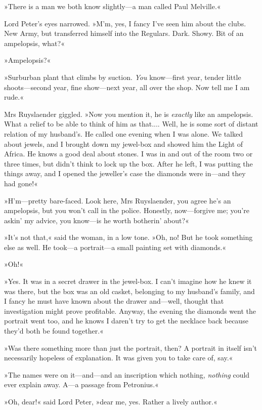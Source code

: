 »There is a man we both know slightly—a man called Paul Melville.«

Lord Peter's eyes narrowed. »M'm, yes, I fancy I've seen him about the clubs. New Army, but transferred himself into the Regulars. Dark. Showy. Bit of an ampelopsis, what?«

»Ampelopsis?«

»Surburban plant that climbs by suction. \textit{You} know—first year, tender little shoots—second year, fine show—next year, all over the shop. Now tell me I am rude.«

Mrs Ruyslaender giggled. »Now you mention it, he is \textit{exactly} like an ampelopsis. What a relief to be able to think of him as that.... Well, he is some sort of distant relation of my husband's. He called one evening when I was alone. We talked about jewels, and I brought down my jewel-box and showed him the Light of Africa. He knows a good deal about stones. I was in and out of the room two or three times, but didn't think to lock up the box. After he left, I was putting the things away, and I opened the jeweller's case the diamonds were in—and they had gone!«

»H'm—pretty bare-faced. Look here, Mrs Ruyslaender, you agree he's an ampelopsis, but you won't call in the police. Honestly, now—forgive me; you're askin' my advice, you know—is he worth botherin' about?«

»It's not that,« said the woman, in a low tone. »Oh, no! But he took something else as well. He took—a portrait—a small painting set with diamonds.«

»Oh!«

»Yes. It was in a secret drawer in the jewel-box. I can't imagine how he knew it was there, but the box was an old casket, belonging to my husband's family, and I fancy he must have known about the drawer and—well, thought that investigation might prove profitable. Anyway, the evening the diamonds went the portrait went too, and he knows I daren't try to get the necklace back because they'd both be found together.«

»Was there something more than just the portrait, then? A portrait in itself isn't necessarily hopeless of explanation. It was given you to take care of, say.«

»The names were on it—and—and an inscription which nothing, \textit{nothing} could ever explain away. A—a passage from Petronius.«

»Oh, dear!« said Lord Peter, »dear me, yes. Rather a lively author.«

